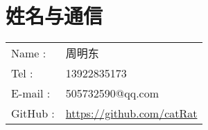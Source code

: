 \section{姓名与通信}
\begin{tabular}{ll}
  Name : & 周明东 \\
  Tel : & 13922835173 \\
  E-mail : & 505732590@qq.com \\
  GitHub : & \url{https://github.com/catRat} \\
\end{tabular}
